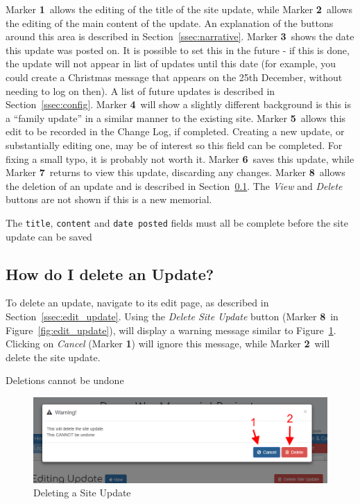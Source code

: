\documentclass[12pt]{article}
\newcommand{\marker}[1]{Marker \color{red}\textbf{#1}\color{black}}
\begin{document}
\marker{1}\ allows the editing of the title of the site update, while \marker{2}\ allows the editing of the main content of the update. An explanation of the buttons around this area is described in Section~\ref{ssec:narrative}. \marker{3}\ shows the date this update was posted on. It is possible to set this in the future - if this is done, the update will not appear in list of updates until this date (for example, you could create a Christmas message that appears on the 25th December, without needing to log on then). A list of future updates is described in Section~\ref{ssec:config}. \marker{4}\ will show a slightly different background is this is a ``family update'' in a similar manner to the existing site. \marker{5}\ allows this edit to be recorded in the Change Log, if completed. Creating a new update, or substantially editing one, may be of interest so this field can be completed. For fixing a small typo, it is probably not worth it. \marker{6}\ saves this update, while \marker{7}\ returns to view this update, discarding any changes. \marker{8}\ allows the deletion of an update and is described in Section~\ref{ssec:delete_update}. The \textit{View} and \textit{Delete} buttons are not shown if this is a new memorial.

\begin{infoBox}
The \texttt{title}, \texttt{content} and \texttt{date posted} fields must all be complete before the site update can be saved
\end{infoBox}

\FloatBarrier
\subsection{How do I delete an Update?}\label{ssec:delete_update}
To delete an update, navigate to its edit page, as described in Section~\ref{ssec:edit_update}. Using the \textit{Delete Site Update} button (\marker{8}\ in Figure~\ref{fig:edit_update}), will display a warning message similar to Figure~\ref{fig:delete_update}. Clicking on \textit{Cancel} (\marker{1}) will ignore this message, while \marker{2}\ will delete the site update.

\begin{warningBox}
Deletions cannot be undone
\end{warningBox}

\begin{figure}[h]
  \centering
 \includegraphics[width=.9\textwidth]{pics/delete_update.png}
	\caption{Deleting a Site Update}\label{fig:delete_update}
\end{figure}
\end{document}
